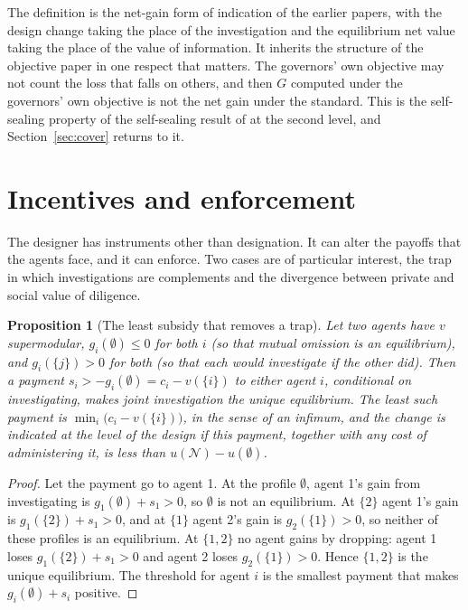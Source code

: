 \documentclass[11pt]{article}
\newcommand{\N}{\mathcal N}
\theoremstyle{plain}
\newtheorem{proposition}{Proposition}
\theoremstyle{definition}
\begin{document}
The definition is the net-gain form of indication of the earlier papers, with the design change taking the place of the investigation and the equilibrium net value taking the place of the value of information. It inherits the structure of the objective paper in one respect that matters. The governors' own objective may not count the loss that falls on others, and then $G$ computed under the governors' own objective is not the net gain under the standard. This is the self-sealing property of the self-sealing result of \cite{flyxion2026objective} at the second level, and Section~\ref{sec:cover} returns to it.

\section{Incentives and enforcement}\label{sec:incentives}

The designer has instruments other than designation. It can alter the payoffs that the agents face, and it can enforce. Two cases are of particular interest, the trap in which investigations are complements and the divergence between private and social value of diligence.

\begin{proposition}[The least subsidy that removes a trap]\label{prop:subsidy}
Let two agents have $v$ supermodular, $g_i(\emptyset)\le0$ for both $i$ (so that mutual omission is an equilibrium), and $g_i(\{j\})>0$ for both (so that each would investigate if the other did). Then a payment $s_i>-g_i(\emptyset)=c_i-v(\{i\})$ to either agent $i$, conditional on investigating, makes joint investigation the unique equilibrium. The least such payment is $\min_i\bigl(c_i-v(\{i\})\bigr)$, in the sense of an infimum, and the change is indicated at the level of the design if this payment, together with any cost of administering it, is less than $u(\N)-u(\emptyset)$.
\end{proposition}

\begin{proof}
Let the payment go to agent 1. At the profile $\emptyset$, agent 1's gain from investigating is $g_1(\emptyset)+s_1>0$, so $\emptyset$ is not an equilibrium. At $\{2\}$ agent 1's gain is $g_1(\{2\})+s_1>0$, and at $\{1\}$ agent 2's gain is $g_2(\{1\})>0$, so neither of these profiles is an equilibrium. At $\{1,2\}$ no agent gains by dropping: agent 1 loses $g_1(\{2\})+s_1>0$ and agent 2 loses $g_2(\{1\})>0$. Hence $\{1,2\}$ is the unique equilibrium. The threshold for agent $i$ is the smallest payment that makes $g_i(\emptyset)+s_i$ positive.
\end{proof}
\end{document}
